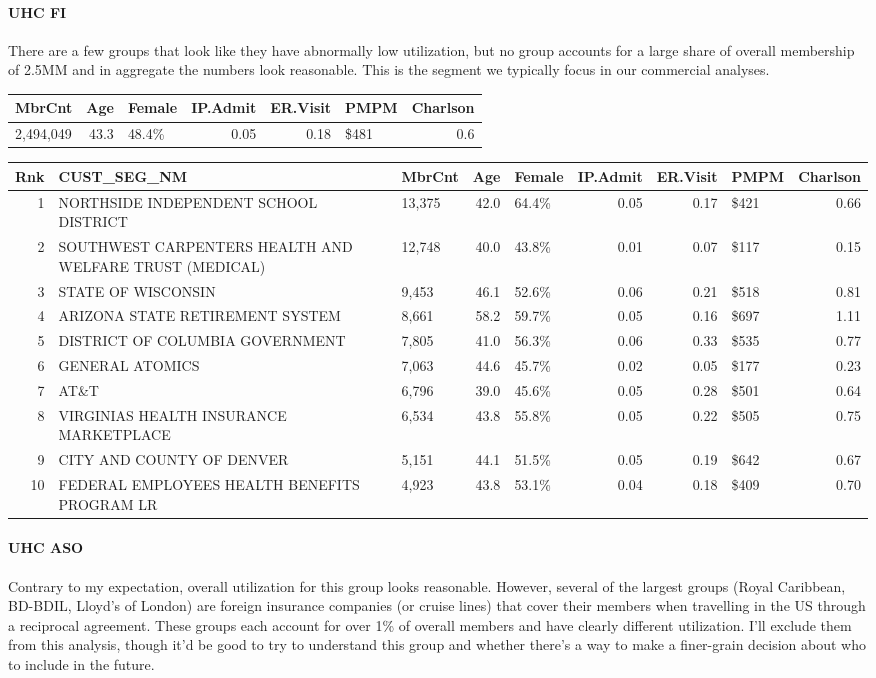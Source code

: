 \documentclass[]{article}
\let\oldparagraph\paragraph
\renewcommand{\paragraph}[1]{\oldparagraph{#1}\mbox{}}
\begin{document}
\paragraph{UHC FI}\label{uhc-fi}

There are a few groups that look like they have abnormally low
utilization, but no group accounts for a large share of overall
membership of 2.5MM and in aggregate the numbers look reasonable. This
is the segment we typically focus in our commercial analyses.

\begin{longtable}[]{@{}lrlrrlr@{}}
\toprule
MbrCnt & Age & Female & IP.Admit & ER.Visit & PMPM &
Charlson\tabularnewline
\midrule
\endhead
2,494,049 & 43.3 & 48.4\% & 0.05 & 0.18 & \$481 & 0.6\tabularnewline
\bottomrule
\end{longtable}

\begin{longtable}[]{@{}rllrlrrlr@{}}
\toprule
Rnk & CUST\_SEG\_NM & MbrCnt & Age & Female & IP.Admit & ER.Visit & PMPM
& Charlson\tabularnewline
\midrule
\endhead
1 & NORTHSIDE INDEPENDENT SCHOOL DISTRICT & 13,375 & 42.0 & 64.4\% &
0.05 & 0.17 & \$421 & 0.66\tabularnewline
2 & SOUTHWEST CARPENTERS HEALTH AND WELFARE TRUST (MEDICAL) & 12,748 &
40.0 & 43.8\% & 0.01 & 0.07 & \$117 & 0.15\tabularnewline
3 & STATE OF WISCONSIN & 9,453 & 46.1 & 52.6\% & 0.06 & 0.21 & \$518 &
0.81\tabularnewline
4 & ARIZONA STATE RETIREMENT SYSTEM & 8,661 & 58.2 & 59.7\% & 0.05 &
0.16 & \$697 & 1.11\tabularnewline
5 & DISTRICT OF COLUMBIA GOVERNMENT & 7,805 & 41.0 & 56.3\% & 0.06 &
0.33 & \$535 & 0.77\tabularnewline
6 & GENERAL ATOMICS & 7,063 & 44.6 & 45.7\% & 0.02 & 0.05 & \$177 &
0.23\tabularnewline
7 & AT\&T & 6,796 & 39.0 & 45.6\% & 0.05 & 0.28 & \$501 &
0.64\tabularnewline
8 & VIRGINIAS HEALTH INSURANCE MARKETPLACE & 6,534 & 43.8 & 55.8\% &
0.05 & 0.22 & \$505 & 0.75\tabularnewline
9 & CITY AND COUNTY OF DENVER & 5,151 & 44.1 & 51.5\% & 0.05 & 0.19 &
\$642 & 0.67\tabularnewline
10 & FEDERAL EMPLOYEES HEALTH BENEFITS PROGRAM LR & 4,923 & 43.8 &
53.1\% & 0.04 & 0.18 & \$409 & 0.70\tabularnewline
\bottomrule
\end{longtable}

\paragraph{UHC ASO}\label{uhc-aso}

Contrary to my expectation, overall utilization for this group looks
reasonable. However, several of the largest groups (Royal Caribbean,
BD-BDIL, Lloyd's of London) are foreign insurance companies (or cruise
lines) that cover their members when travelling in the US through a
reciprocal agreement. These groups each account for over 1\% of overall
members and have clearly different utilization. I'll exclude them from
this analysis, though it'd be good to try to understand this group and
whether there's a way to make a finer-grain decision about who to
include in the future.
\end{document}
